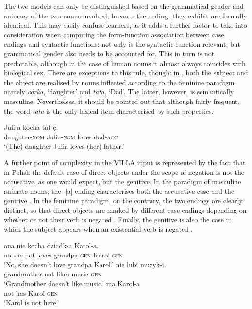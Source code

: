 The two models can only be distinguished based on the grammatical gender and animacy of the two nouns involved, because the endings they exhibit are formally identical. This may easily confuse learners, as it adds a further factor to take into consideration when computing the form-function association between case endings and syntactic functions: not only is the syntactic function relevant, but grammatical gender also needs to be accounted for. This in turn is not predictable, although in the case of human nouns it almost always coincides with biological sex. There are exceptions to this rule, though: in , both the subject and the object are realised by nouns inflected according to the feminine paradigm, namely \textit{córka}, ‘daughter’ and \textit{tata}, ‘Dad’. The latter, however, is semantically masculine. Nevertheless, it should be pointed out that although fairly frequent, the word \textit{tata} is the only lexical item characterised by such properties.

\ea%
    \label{ex:08:5}
         {Juli-a}     {kocha} {tat-ę.}\\
            daughter-\textsc{nom}  Julia-\textsc{nom}  loves  dad-\textsc{acc}\\
    \glt    ‘(The) daughter Julia loves (her) father.’
    \z

A further point of complexity in the VILLA input is represented by the fact that in Polish the default case of direct objects under the scope of negation is not the accusative, as one would expect, but the genitive. In the paradigm of masculine animate nouns, the -[a] ending characterises both the accusative case and the genitive . In the feminine paradigm, on the contrary, the two endings are clearly distinct, so that direct objects are marked by different case endings depending on whether or not their verb is negated . Finally, the genitive is also the case in which the subject appears when an existential verb is negated .

\ea%
    \label{ex:08:6}
    \ea\label{ex:08:6a}
       {ona}   {nie}   {kocha}   {dziadk-a}   {Karol-a.} \\
            no  she  not  loves  grandpa-\textsc{gen}  Karol-\textsc{gen} \\
    \glt    ‘No, she doesn't love grandpa Karol.’
    \ex\label{ex:08:6b}
       {nie}   {lubi}   {muzyk-i.}\\
            grandmother  not  likes  music-\textsc{gen}\\
    \glt    ‘Grandmother doesn't like music.’
    \ex\label{ex:08:6c}
      {ma}  {Karol-a}\\
            not  has  Karol-\textsc{gen}\\
    \glt    ‘Karol is not here.’
    \z
\z

